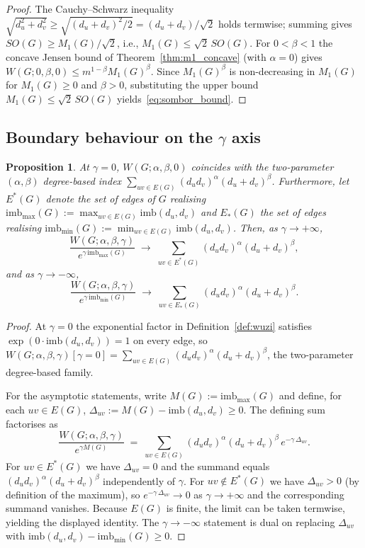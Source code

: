 \documentclass[11pt,a4paper]{article}
\newtheorem{proposition}[theorem]{Proposition}
\theoremstyle{definition}
\newcommand{\Wuzi}{W(G;\alpha,\beta,\gamma)}
\begin{document}
\begin{proof}
The Cauchy--Schwarz inequality
$\sqrt{d_u^2 + d_v^2} \ge \sqrt{(d_u + d_v)^2 / 2} = (d_u + d_v) / \sqrt{2}$
holds termwise; summing gives $SO(G) \ge M_1(G) / \sqrt{2}$, i.e.,
$M_1(G) \le \sqrt{2}\, SO(G)$. For $0 < \beta < 1$ the concave
Jensen bound of Theorem~\ref{thm:m1_concave} (with $\alpha = 0$)
gives $W(G; 0, \beta, 0) \le m^{1 - \beta} M_1(G)^{\beta}$. Since
$M_1(G)^{\beta}$ is non-decreasing in $M_1(G)$ for $M_1(G) \ge 0$
and $\beta > 0$, substituting the upper bound $M_1(G) \le \sqrt{2}\, SO(G)$
yields~\eqref{eq:sombor_bound}.
\end{proof}

\subsection{Boundary behaviour on the $\gamma$ axis}\label{sub:gamma_axis}

\begin{proposition}\label{prop:gamma_eq_0_or_inf}
At $\gamma=0$, $W(G;\alpha,\beta,0)$ coincides with the two-parameter
$(\alpha,\beta)$ degree-based index
$\sum_{uv\in E(G)} (d_u d_v)^{\alpha}(d_u+d_v)^{\beta}$. Furthermore,
let $E^{*}(G)$ denote the set of edges of $G$ realising
$\mathrm{imb}_{\max}(G) := \max_{uv\in E(G)} \mathrm{imb}(d_u,d_v)$
and $E_{*}(G)$ the set of edges realising
$\mathrm{imb}_{\min}(G) := \min_{uv\in E(G)} \mathrm{imb}(d_u,d_v)$.
Then, as $\gamma\to+\infty$,
\[
\frac{\Wuzi}{e^{\gamma\,\mathrm{imb}_{\max}(G)}}
\;\longrightarrow\;
\sum_{uv\in E^{*}(G)} (d_u d_v)^{\alpha}(d_u+d_v)^{\beta},
\]
and as $\gamma\to-\infty$,
\[
\frac{\Wuzi}{e^{\gamma\,\mathrm{imb}_{\min}(G)}}
\;\longrightarrow\;
\sum_{uv\in E_{*}(G)} (d_u d_v)^{\alpha}(d_u+d_v)^{\beta}.
\]
\end{proposition}

\begin{proof}
At $\gamma=0$ the exponential factor in Definition~\ref{def:wuzi}
satisfies $\exp(0\cdot\mathrm{imb}(d_u,d_v))=1$ on every edge, so
$\Wuzi[\gamma=0]=\sum_{uv\in E(G)}(d_u d_v)^{\alpha}(d_u+d_v)^{\beta}$,
the two-parameter degree-based family.

For the asymptotic statements, write
$M(G):=\mathrm{imb}_{\max}(G)$ and define, for each $uv\in E(G)$,
$\Delta_{uv}:=M(G)-\mathrm{imb}(d_u,d_v)\ge 0$. The defining sum
factorises as
\[
\frac{\Wuzi}{e^{\gamma M(G)}}
\;=\;\sum_{uv\in E(G)}
(d_u d_v)^{\alpha}(d_u+d_v)^{\beta}\,
e^{-\gamma\,\Delta_{uv}}.
\]
For $uv\in E^{*}(G)$ we have $\Delta_{uv}=0$ and the summand equals
$(d_u d_v)^{\alpha}(d_u+d_v)^{\beta}$ independently of $\gamma$.
For $uv\notin E^{*}(G)$ we have $\Delta_{uv}>0$ (by definition of the
maximum), so $e^{-\gamma\,\Delta_{uv}}\to 0$ as $\gamma\to+\infty$ and
the corresponding summand vanishes. Because $E(G)$ is finite, the
limit can be taken termwise, yielding the displayed identity. The
$\gamma\to-\infty$ statement is dual on replacing
$\Delta_{uv}$ with $\mathrm{imb}(d_u,d_v)-\mathrm{imb}_{\min}(G)\ge 0$.
\end{proof}
\end{document}
